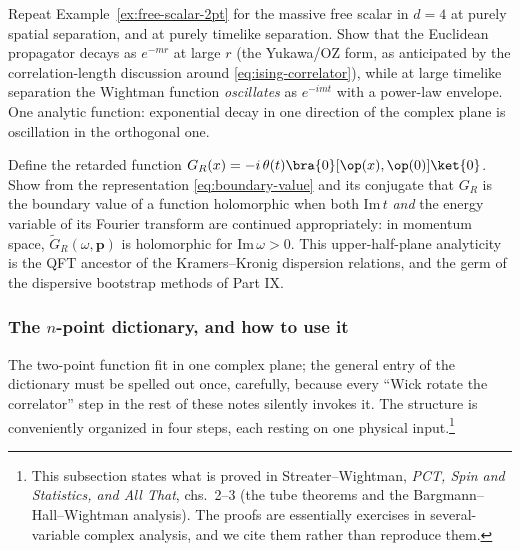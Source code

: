 \begin{exercise}[easy]
\label{exr:massive-wightman}
Repeat Example~\ref{ex:free-scalar-2pt} for the massive free scalar in $d=4$ at
purely spatial separation, and at purely timelike separation. Show that the
Euclidean propagator decays as $e^{-mr}$ at large $r$ (the Yukawa/OZ form, as
anticipated by the correlation-length discussion around
\eqref{eq:ising-correlator}), while at large timelike separation the Wightman
function \emph{oscillates} as $e^{-imt}$ with a power-law envelope. One
analytic function: exponential decay in one direction of the complex plane is
oscillation in the orthogonal one.
\end{exercise}

\begin{exercise}[medium]
\label{exr:retarded}
Define the retarded function $G_R(x) = -i\,\theta(t)\bra{0}[\op(x),
\op(0)]\ket{0}$. Show from the representation \eqref{eq:boundary-value} and its
conjugate that $G_R$ is the boundary value of a function holomorphic when both
$\mathrm{Im}\,t$ \emph{and} the energy variable of its Fourier transform are
continued appropriately: in momentum space, $\tilde G_R(\omega, \mathbf{p})$ is
holomorphic for $\mathrm{Im}\,\omega > 0$. This upper-half-plane analyticity is
the QFT ancestor of the Kramers--Kronig dispersion relations, and the germ of
the dispersive bootstrap methods of Part IX.
\end{exercise}

\subsubsection{The $n$-point dictionary, and how to use it}
\label{sec:npoint-dictionary}

The two-point function fit in one complex plane; the general entry of the
dictionary must be spelled out once, carefully, because every
``Wick rotate the correlator'' step in the rest of these notes silently
invokes it. The structure is conveniently organized in four steps, each
resting on one physical input.\footnote{This subsection states what is
proved in Streater--Wightman, \emph{PCT, Spin and Statistics, and All That},
chs.\ 2--3 (the tube theorems and the Bargmann--Hall--Wightman analysis).
The proofs are essentially exercises in several-variable complex analysis,
and we cite them rather than reproduce them.}

